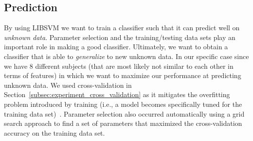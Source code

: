 \subsection{Prediction}
\label{subsec:experiment_prediction}
By using LIBSVM we want to train a classifier such that it can predict well on \emph{unknown data}. Parameter selection and the training/testing data sets play an important role in making a good classifier. Ultimately, we want to obtain a classifier that is able to \emph{generalize} to new unknown data. In our specific case since we have 8 different subjects (that are most likely not similar to each other in terms of features) in which we want to maximize our performance at predicting unknown data. We used cross-validation in Section~\ref{subsec:experiment_cross_validation} as it mitigates the overfitting problem introduced by training (i.e., a model becomes specifically tuned for the training data set)~\cite{HCL03}. Parameter selection also occurred automatically using a grid search approach to find a set of parameters that maximized the cross-validation accuracy on the training data set.


